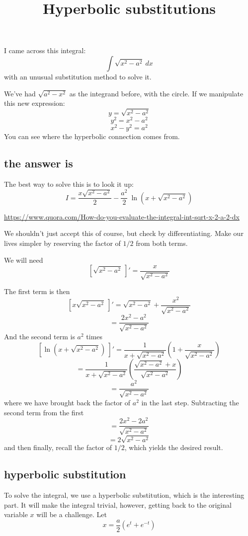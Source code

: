 \documentclass[11pt, oneside]{article}
\title{Hyperbolic substitutions}
\date{}
\begin{document}
\maketitle
\Large

I came across this integral:
\[ \int \sqrt{x^2 - a^2} \ dx \]
with an unusual substitution method to solve it.

We've had $\sqrt{a^2 - x^2}$ as the integrand before, with the circle.  If we manipulate this new expression:
\[ y = \sqrt{x^2 - a^2} \]
\[ y^2 = x^2 - a^2 \]
\[ x^2 - y^2 = a^2 \]
You can see where the hyperbolic connection comes from.  

\subsection*{the answer is}
The best way to solve this is to look it up:
\[ I = \frac{x \sqrt{x^2-a^2}}{2} - \frac{a^2}{2} \ \ln(x + \sqrt{x^2 - a^2}) \]

\url{https://www.quora.com/How-do-you-evaluate-the-integral-int-sqrt-x-2-a-2-dx}

We shouldn't just accept this of course, but check by differentiating.  Make our lives simpler by reserving the factor of $1/2$ from both terms.

We will need
\[ [ \sqrt{x^2 - a^2} \ ]' = \frac{x}{\sqrt{x^2-a^2}} \]

The first term is then
\[  [ x \sqrt{x^2-a^2} \ ]' =  \sqrt{x^2-a^2} + \frac{x^2}{\sqrt{x^2-a^2}} \]
\[ = \frac{2x^2 - a^2}{\sqrt{x^2-a^2}} \]
And the second term is $a^2$ times
\[  [ \ln(x + \sqrt{x^2 - a^2}) \ ]' = \frac{1}{x + \sqrt{x^2 - a^2}} (1 +  \frac{x}{\sqrt{x^2-a^2}} ) \]
\[ = \frac{1}{x + \sqrt{x^2 - a^2}} (\frac{\sqrt{x^2-a^2} + x}{\sqrt{x^2-a^2}} ) \]
\[ = \frac{a^2}{\sqrt{x^2-a^2}} \]
where we have brought back the factor of $a^2$ in the last step.  Subtracting the second term from the first
\[ = \frac{2x^2 - 2a^2}{\sqrt{x^2-a^2}} \] 
\[ = 2 \sqrt{x^2-a^2} \]
and then finally, recall the factor of $1/2$, which yields the desired result.

\subsection*{hyperbolic substitution}
To solve the integral, we use a hyperbolic substitution, which is the interesting part.  It will make the integral trivial, however, getting back to the original variable $x$ will be a challenge.  Let
\[ x = \frac{a}{2} (e^t + e^{-t}) \]
\end{document}
